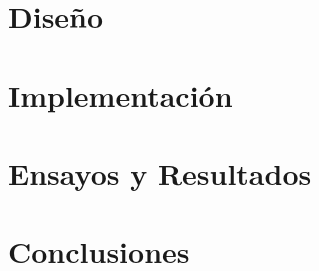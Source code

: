 \documentclass[
11pt, %
spanish,
singlespacing, %
parskip, %
headsepline, %
]{MastersDoctoralThesis} %
\begin{document}
\chapter{Diseño}
\label{ChapterDiseno}























\chapter{Implementación}
\label{ChapterImplementacion}














\chapter{Ensayos y Resultados}
\label{ChapterEnsayosYResultados}



\chapter{Conclusiones} %
\label{ChapterConclusiones} %
\end{document}
